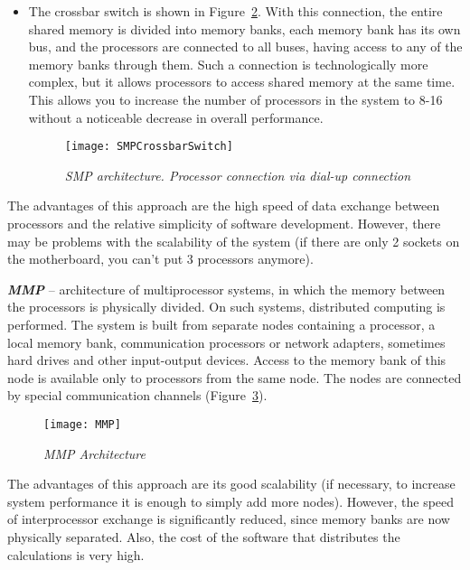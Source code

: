 {\begin{itemize}
\begin{figure}[H]
					\caption{\textit{SMP architecture. Processor connection via system bus}}
					\label{SMPSystemBus:image}
				\end{figure}
			\item The crossbar switch is shown in Figure~\ref{SMPCrossbarSwitch:image}. With this connection, the entire shared memory is divided into memory banks, each memory bank has its own bus, and the processors are connected to all buses, having access to any of the memory banks through them. Such a connection is technologically more complex, but it allows processors to access shared memory at the same time. This allows you to increase the number of processors in the system to 8-16 without a noticeable decrease in overall performance.
				\begin{figure}[H]
					\texttt{[image: SMPCrossbarSwitch]}
					\caption{\textit{SMP architecture. Processor connection via dial-up connection}}
					\label{SMPCrossbarSwitch:image}
				\end{figure}
		\end{itemize}
	\par The advantages of this approach are the high speed of data exchange between processors and the relative simplicity of software development. However, there may be problems with the scalability of the system (if there are only 2 sockets on the motherboard, you can’t put 3 processors anymore).
	\par\textbf{\textit{MMP}} -- architecture of multiprocessor systems, in which the memory between the processors is physically divided. On such systems, distributed computing is performed. The system is built from separate nodes containing a processor, a local memory bank, communication processors or network adapters, sometimes hard drives and other input-output devices. Access to the memory bank of this node is available only to processors from the same node. The nodes are connected by special communication channels (Figure~\ref{MMP:image}).
		\begin{figure}[H]
			\texttt{[image: MMP]}
			\caption{\textit{MMP Architecture}}
			\label{MMP:image}
		\end{figure}
	\par The advantages of this approach are its good scalability (if necessary, to increase system performance it is enough to simply add more nodes). However, the speed of interprocessor exchange is significantly reduced, since memory banks are now physically separated. Also, the cost of the software that distributes the calculations is very high.
	\par
}
